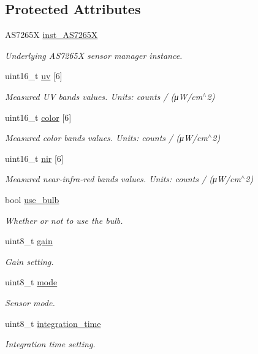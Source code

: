 \subsection*{Protected Attributes}
\begin{DoxyCompactItemize}
\item 
A\+S7265X \hyperlink{class_loom___a_s7265_x_a929b53e4170b78bfe3ca8787525dc4e7}{inst\+\_\+\+A\+S7265X}
\begin{DoxyCompactList}\small\item\em Underlying A\+S7265X sensor manager instance. \end{DoxyCompactList}\item 
uint16\+\_\+t \hyperlink{class_loom___a_s7265_x_a0724af751e2f38c7f71fc5828910f6fe}{uv} \mbox{[}6\mbox{]}
\begin{DoxyCompactList}\small\item\em Measured UV bands values. Units\+: counts / (μ\+W/cm$^\wedge$2) \end{DoxyCompactList}\item 
uint16\+\_\+t \hyperlink{class_loom___a_s7265_x_aaf555d167aca2607fa0f13c71341f3b1}{color} \mbox{[}6\mbox{]}
\begin{DoxyCompactList}\small\item\em Measured color bands values. Units\+: counts / (μ\+W/cm$^\wedge$2) \end{DoxyCompactList}\item 
uint16\+\_\+t \hyperlink{class_loom___a_s7265_x_a6f2c89c5aed39f75a275f37ce3ea21bd}{nir} \mbox{[}6\mbox{]}
\begin{DoxyCompactList}\small\item\em Measured near-\/infra-\/red bands values. Units\+: counts / (μ\+W/cm$^\wedge$2) \end{DoxyCompactList}\item 
bool \hyperlink{class_loom___a_s7265_x_a33831b2827d06b2114225b57862445f7}{use\+\_\+bulb}
\begin{DoxyCompactList}\small\item\em Whether or not to use the bulb. \end{DoxyCompactList}\item 
uint8\+\_\+t \hyperlink{class_loom___a_s7265_x_a204831caa774ead3b9ba57495e17bfd9}{gain}
\begin{DoxyCompactList}\small\item\em Gain setting. \end{DoxyCompactList}\item 
uint8\+\_\+t \hyperlink{class_loom___a_s7265_x_a02bc2eaf8dfea91f9f47a19f49dcc1e9}{mode}
\begin{DoxyCompactList}\small\item\em Sensor mode. \end{DoxyCompactList}\item 
uint8\+\_\+t \hyperlink{class_loom___a_s7265_x_a656e32aedff07ca33e3b9b0dc2768ba8}{integration\+\_\+time}
\begin{DoxyCompactList}\small\item\em Integration time setting. \end{DoxyCompactList}\end{DoxyCompactItemize}
